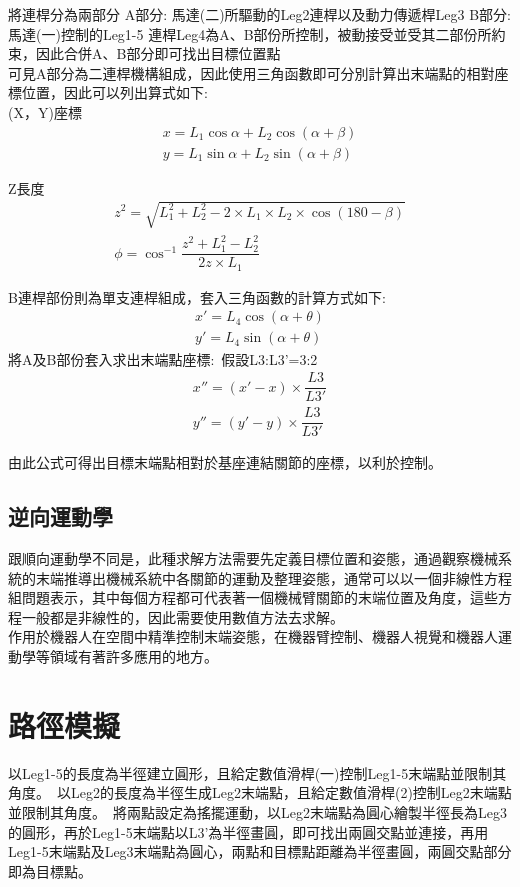 將連桿分為兩部分
A部分: 馬達(二)所驅動的Leg2連桿以及動力傳遞桿Leg3
B部分:馬達(一)控制的Leg1-5
連桿Leg4為A、B部份所控制，被動接受並受其二部份所約束，因此合併A、B部分即可找出目標位置點\\
可見A部分為二連桿機構組成，因此使用三角函數即可分別計算出末端點的相對座標位置，因此可以列出算式如下:\\

(X，Y)座標    
\[
\begin{aligned}
x=L_{1}\cos \alpha +L_{2}\cos \left( \alpha +\beta \right)\\
y=L_{1}\sin \alpha +L_{2}\sin \left( \alpha +\beta \right) 
\end{aligned}
\]

Z長度
\[
\begin{aligned}
z^{2}=\sqrt{L_{1}^{2}+L_{2}^{2}-2\times L_{1}\times L_{2}\times \cos \left( 180-\beta \right) }\\
\phi =\cos ^{-1}\dfrac{z^{2}+L_{1}^{2}-L_{2}^{2}}{2z\times L_{1}}
\end{aligned}
\]

B連桿部份則為單支連桿組成，套入三角函數的計算方式如下:\
\[
\begin{aligned}
x'=L_{4}\cos \left( \alpha +\theta \right)\\
y'=L_{4}\sin \left( \alpha +\theta \right)
\end{aligned}
\]
將A及B部份套入求出末端點座標:\
假設L3:L3'=3:2\
\[
\begin{aligned}
x''=\left( x'-x\right) \times \dfrac{L3}{L3'}\\
y''=\left( y'-y\right) \times \dfrac{L3}{L3'}
\end{aligned}
\]

由此公式可得出目標末端點相對於基座連結關節的座標，以利於控制。\

\subsection{逆向運動學}
跟順向運動學不同是，此種求解方法需要先定義目標位置和姿態，通過觀察機械系統的末端推導出機械系統中各關節的運動及整理姿態，通常可以以一個非線性方程組問題表示，其中每個方程都可代表著一個機械臂關節的末端位置及角度，這些方程一般都是非線性的，因此需要使用數值方法去求解。\\
作用於機器人在空間中精準控制末端姿態，在機器臂控制、機器人視覺和機器人運動學等領域有著許多應用的地方。\\

\section{路徑模擬}
以Leg1-5的長度為半徑建立圓形，且給定數值滑桿(一)控制Leg1-5末端點並限制其角度。\
以Leg2的長度為半徑生成Leg2末端點，且給定數值滑桿(2)控制Leg2末端點並限制其角度。\
將兩點設定為搖擺運動，以Leg2末端點為圓心繪製半徑長為Leg3的圓形，再於Leg1-5末端點以L3’為半徑畫圓，即可找出兩圓交點並連接，再用Leg1-5末端點及Leg3末端點為圓心，兩點和目標點距離為半徑畫圓，兩圓交點部分即為目標點。
\newpage
